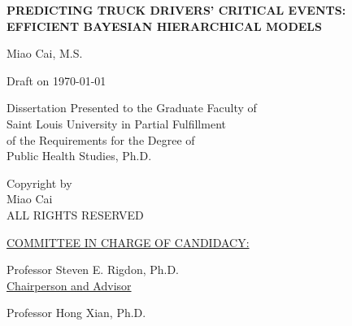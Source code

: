 \documentclass[12pt]{book}
\numberwithin{equation}{chapter}
\newenvironment{bottompar}{\par\vspace*{\fill}}{\clearpage}%
\begin{document}
\begin{titlepage}
\vspace{1cm}
\begin{center}
\linespread{2}\normalsize \bfseries \MakeUppercase{Predicting Truck Drivers' Critical Events: Efficient Bayesian Hierarchical Models}
\end{center}

\vspace{7cm}

\begin{center}
{Miao Cai,  M.S.}
\vspace{0.3cm}

Draft on \today

\vspace{9cm}

Dissertation Presented to the Graduate Faculty of \\
Saint Louis University in Partial Fulfillment \\
of the Requirements for the Degree of\\
Public Health Studies, Ph.D.\\
\vspace{.5cm}
\the\year
\end{center}

\end{titlepage}
\clearpage


\begin{bottompar}
\begin{center}
\textcopyright \xspace Copyright by\\
Miao Cai \\
ALL RIGHTS RESERVED\\
\vspace{.5cm}
\the\year
\end{center}
\end{bottompar}

\vspace*{\fill}
\underline{COMMITTEE IN CHARGE OF CANDIDACY:}

\vspace{.3cm}
Professor Steven E. Rigdon, Ph.D.\\
{\setlength{\parindent}{20ex}  \indent \underline{Chairperson and Advisor}}

\vspace{.3cm}
Professor Hong Xian, Ph.D.
\end{document}
